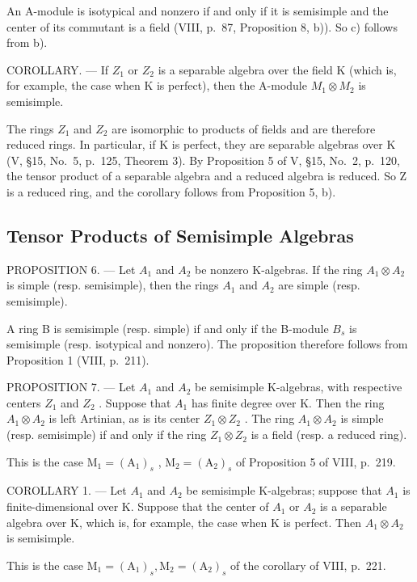 An A-module is isotypical and nonzero if and only if it is semisimple and the center of its commutant is a field (VIII, p.~87, Proposition 8, b)). So c) follows from b).

COROLLARY. --- If \(Z_{1}\) or \(Z_{2}\) is a separable algebra over the field K (which is, for example, the case when K is perfect), then the A-module \(M_{1} \otimes M_{2}\) is semisimple.

The rings \(Z_{1}\) and \(Z_{2}\) are isomorphic to products of fields and are therefore reduced rings. In particular, if K is perfect, they are separable algebras over K (V, §15, No.~5, p.~125, Theorem 3). By Proposition 5 of V, §15, No.~2, p.~120, the tensor product of a separable algebra and a reduced algebra is reduced. So Z is a reduced ring, and the corollary follows from Proposition 5, b).

\subsection{Tensor Products of Semisimple Algebras}

PROPOSITION 6. --- Let \(A_{1}\) and \(A_{2}\) be nonzero K-algebras. If the ring \(A_{1} \otimes A_{2}\) is simple (resp. semisimple), then the rings \(A_{1}\) and \(A_{2}\) are simple (resp. semisimple).

A ring B is semisimple (resp. simple) if and only if the B-module \(B_{s}\) is semisimple (resp. isotypical and nonzero). The proposition therefore follows from Proposition 1 (VIII, p.~211).

PROPOSITION 7. --- Let \(A_{1}\) and \(A_{2}\) be semisimple K-algebras, with respective centers \(Z_{1}\) and \(Z_{2}\) . Suppose that \(A_{1}\) has finite degree over K. Then the ring \(A_{1} \otimes A_{2}\) is left Artinian, as is its center \(Z_{1} \otimes Z_{2}\) . The ring \(A_{1} \otimes A_{2}\) is simple (resp. semisimple) if and only if the ring \(Z_{1} \otimes Z_{2}\) is a field (resp. a reduced ring).

This is the case \(\mathrm{M}_1 = (\mathrm{A}_1)_s\) , \(\mathrm{M}_2 = (\mathrm{A}_2)_s\) of Proposition 5 of VIII, p.~219.

COROLLARY 1. --- Let \(A_{1}\) and \(A_{2}\) be semisimple K-algebras; suppose that \(A_{1}\) is finite-dimensional over K. Suppose that the center of \(A_{1}\) or \(A_{2}\) is a separable algebra over K, which is, for example, the case when K is perfect. Then \(A_{1} \otimes A_{2}\) is semisimple.

This is the case \(\mathrm{M}_{1}=(\mathrm{A}_{1})_{s},\mathrm{M}_{2}=(\mathrm{A}_{2})_{s}\) of the corollary of VIII, p.~221.

